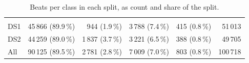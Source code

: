 \begin{table}[H]
  \centering
  \caption{Beats per class in each split, as count and share of the split.}
  \label{tab:class-totals}
  \begin{tabularx}{\linewidth}{YRRRRR}
     &  &  &  &  &  \\
    DS1 & 45\,866 (89.9\,\%) & 944 (1.9\,\%) & 3\,788 (7.4\,\%) & 415 (0.8\,\%) & 51\,013 \\
    DS2 & 44\,259 (89.0\,\%) & 1\,837 (3.7\,\%) & 3\,221 (6.5\,\%) & 388 (0.8\,\%) & 49\,705 \\
    All & 90\,125 (89.5\,\%) & 2\,781 (2.8\,\%) & 7\,009 (7.0\,\%) & 803 (0.8\,\%) & 100\,718 \\
    \bottomrule
  \end{tabularx}
\end{table}
